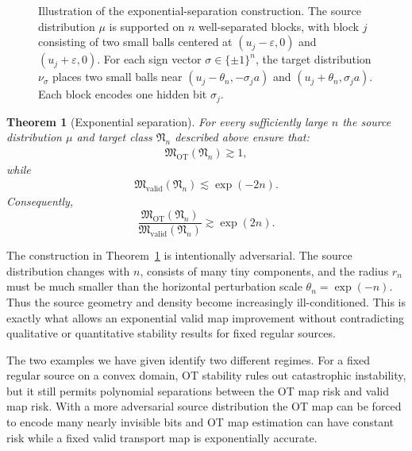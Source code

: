 \documentclass[11pt,twoside]{article}
\newtheorem{theorem}{Theorem}
\newcommand{\targetclass}{\mathfrak{N}}
\newcommand{\validminimaxrisk}{\mathfrak{M}_{\text{valid}}}
\newcommand{\otminimaxrisk}{\mathfrak{M}_{\text{OT}}}
\begin{document}
\begin{figure}[t]
\caption{Illustration of the exponential-separation construction. The source distribution $\mu$ is supported on $n$ well-separated blocks, with block $j$ consisting of two small balls centered at $(u_j-\varepsilon,0)$ and $(u_j+\varepsilon,0)$. For each sign vector $\sigma\in\{\pm1\}^n$, the target distribution $\nu_\sigma$ places two small balls near $(u_j-\theta_n,-\sigma_j a)$ and $(u_j+\theta_n,\sigma_j a)$. Each block encodes one hidden bit $\sigma_j$.}
\label{fig:exp-separation-construction}
\end{figure}

\begin{theorem}[Exponential separation]
\label{thm:exponential-separation}
For every sufficiently large $n$ the source distribution $\mu$ and target class $\targetclass_n$ described above ensure that:
\begin{align}
\label{eq:exp-ot-lower}
\otminimaxrisk(\targetclass_n)
\gtrsim 1,
\end{align}
while
\begin{align}
\label{eq:exp-valid-upper}
\validminimaxrisk(\targetclass_n)
\lesssim
\exp(-2n).
\end{align}
Consequently,
\[
\frac{\otminimaxrisk(\targetclass_n)}
{\validminimaxrisk(\targetclass_n)}
\gtrsim \exp(2n).
\]
\end{theorem}

The construction in Theorem~\ref{thm:exponential-separation} is intentionally adversarial. The source distribution changes with $n$, consists of many tiny components, and the radius $r_n$ must be much smaller than the horizontal perturbation scale $\theta_n=\exp(-n)$. Thus the source geometry and density become increasingly ill-conditioned. This is exactly what allows an exponential valid map improvement without contradicting qualitative or quantitative stability results for fixed regular sources.

The two examples we have given identify two different regimes. For a fixed regular source on a convex domain, OT stability rules out catastrophic instability, but it still permits polynomial separations between the OT map risk and valid map risk. With a more adversarial source distribution the OT map can be forced to encode many nearly invisible bits and OT map estimation can have constant risk while a fixed valid transport map is exponentially accurate.
\end{document}
